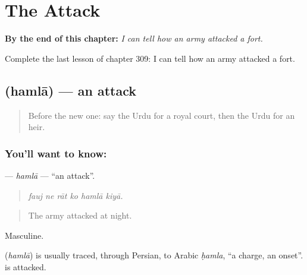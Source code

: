 
\chapter{The Attack}
\label{ch:ur-the-attack}

\begin{chapteropening}
\textbf{By the end of this chapter:} \emph{I can tell how an army attacked a fort.}

Complete the last lesson of chapter 309: I can tell how an army attacked a fort.
\end{chapteropening}

\section[\texorpdfstring{\ur{حملہ} (hamlā)}{حملہ (hamlā)}]{ (hamlā) — an attack}

\label{lesson:UR-C309-hamla}



\begin{quote}
Before the new one: say the Urdu for a royal court, then the Urdu for an heir.
\end{quote}

\subsection*{You'll want to know: }
\textbf{} — \emph{hamlā} — \textquotedblleft{}an attack\textquotedblright{}.

\begin{quote}
     
\end{quote}

\begin{quote}
\emph{fauj ne rāt ko hamlā kiyā.}
\end{quote}

\begin{quote}
The army attacked at night.
\end{quote}

Masculine.

\begin{cousinweb}
\textbf{} (\emph{hamlā}) is usually traced, through Persian, to Arabic \emph{ḥamla}, \textquotedblleft{}a charge, an onset\textquotedblright{}. \textbf{ } is attacked.
\end{cousinweb}

